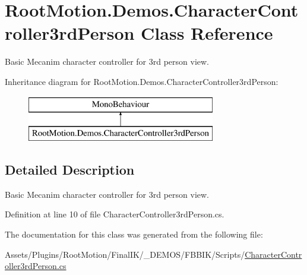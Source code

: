 \hypertarget{class_root_motion_1_1_demos_1_1_character_controller3rd_person}{}\section{Root\+Motion.\+Demos.\+Character\+Controller3rd\+Person Class Reference}
\label{class_root_motion_1_1_demos_1_1_character_controller3rd_person}


Basic Mecanim character controller for 3rd person view.  


Inheritance diagram for Root\+Motion.\+Demos.\+Character\+Controller3rd\+Person\+:\begin{figure}[H]
\begin{center}
\leavevmode
\includegraphics[height=2.000000cm]{class_root_motion_1_1_demos_1_1_character_controller3rd_person}
\end{center}
\end{figure}


\subsection{Detailed Description}
Basic Mecanim character controller for 3rd person view. 



Definition at line 10 of file Character\+Controller3rd\+Person.\+cs.



The documentation for this class was generated from the following file\+:\begin{DoxyCompactItemize}
\item 
Assets/\+Plugins/\+Root\+Motion/\+Final\+I\+K/\+\_\+\+D\+E\+M\+O\+S/\+F\+B\+B\+I\+K/\+Scripts/\mbox{\hyperlink{_character_controller3rd_person_8cs}{Character\+Controller3rd\+Person.\+cs}}\end{DoxyCompactItemize}
